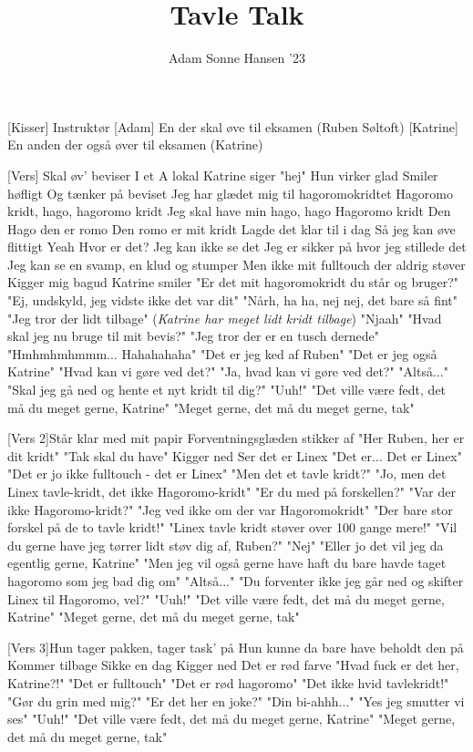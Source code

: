 \documentclass[a4paper,11pt]{article}
\title{Tavle Talk}
\author{Adam Sonne Hansen '23}
\begin{document}
\maketitle

\begin{roles}
[Kisser] Instruktør
[Adam] En der skal øve til eksamen (Ruben Søltoft)
[Katrine] En anden der også øver til eksamen (Katrine)
\end{roles}

\begin{song}
[Vers] 
  Skal øv' beviser
I et A lokal
Katrine siger "hej"
Hun virker glad
Smiler høfligt
Og tænker på beviset
Jeg har glædet mig til hagoromokridtet
Hagoromo kridt, hago, hagoromo kridt
Jeg skal have min hago, hago
Hagoromo kridt
Den Hago den er romo
Den romo er mit kridt
Lagde det klar til i dag
Så jeg kan øve flittigt
Yeah
Hvor er det?
Jeg kan ikke se det
Jeg er sikker på hvor jeg stillede det
Jeg kan se en svamp, en klud og stumper
Men ikke mit fulltouch der aldrig støver
Kigger mig bagud
Katrine smiler
"Er det mit hagoromokridt du står og bruger?"
"Ej, undskyld, jeg vidste ikke det var dit"
"Nårh, ha ha, nej nej, det bare så fint"
"Jeg tror der lidt tilbage" (\textit{Katrine har meget lidt kridt tilbage})
"Njaah"
"Hvad skal jeg nu bruge til mit bevis?"
"Jeg tror der er en tusch dernede"
"Hmhmhmhmmm... Hahahahaha"
"Det er jeg ked af Ruben"
"Det er jeg også Katrine"
"Hvad kan vi gøre ved det?"
"Ja, hvad kan vi gøre ved det?"
"Altså..."
"Skal jeg gå ned og hente et nyt kridt til dig?"
"Uuh!"
"Det ville være fedt, det må du meget gerne, Katrine"
"Meget gerne, det må du meget gerne, tak"

[Vers 2]Står klar med mit papir
Forventningsglæden stikker af
"Her Ruben, her er dit kridt"
"Tak skal du have"
Kigger ned
Ser det er Linex
"Det er... Det er Linex"
"Det er jo ikke fulltouch - det er Linex"
"Men det et tavle kridt?"
"Jo, men det Linex tavle-kridt, det ikke Hagoromo-kridt"
"Er du med på forskellen?"
"Var der ikke Hagoromo-kridt?"
"Jeg ved ikke om der var Hagoromokridt"
"Der bare stor forskel på de to tavle kridt!"
"Linex tavle kridt støver over 100 gange mere!"
"Vil du gerne have jeg tørrer lidt støv dig af, Ruben?"
"Nej"
"Eller jo det vil jeg da egentlig gerne, Katrine"
"Men jeg vil også gerne have haft du bare havde taget hagoromo som jeg bad dig om"
"Altså..."
"Du forventer ikke jeg går ned og skifter Linex til Hagoromo, vel?"
"Uuh!"
"Det ville være fedt, det må du meget gerne, Katrine"
"Meget gerne, det må du meget gerne, tak"

\newpage
{}[Vers 3]Hun tager pakken, tager task' på
Hun kunne da bare have beholdt den på
Kommer tilbage
Sikke en dag
Kigger ned
Det er rød farve
"Hvad fuck er det her, Katrine?!"
"Det er fulltouch"
"Det er rød hagoromo"
"Det ikke hvid tavlekridt!"
"Gør du grin med mig?"
"Er det her en joke?"
"Din bi-ahhh..."
"Yes jeg smutter vi ses"
"Uuh!"
"Det ville være fedt, det må du meget gerne, Katrine"
"Meget gerne, det må du meget gerne, tak"
\end{song}
\end{document}
